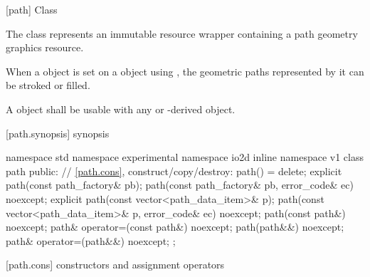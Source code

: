  [path] {Class }

\pnum
{}
The  class represents an immutable resource wrapper containing a path geometry graphics resource.

\pnum
When a  object is set on a  object using 
, the geometric paths represented by it can be 
stroked or filled.

\pnum
A  object shall be usable with any  or -derived object.

 [path.synopsis] { synopsis}

\begin{codeblock}
namespace std { namespace experimental { namespace io2d { inline namespace v1 {
  class path {
    public:
    // \ref{path.cons}, construct/copy/destroy:
    path() = delete;
    explicit path(const path_factory& pb);
    path(const path_factory& pb, error_code& ec) noexcept;
    explicit path(const vector<path_data_item>& p);
    path(const vector<path_data_item>& p, error_code& ec) noexcept;
    path(const path&) noexcept;
    path& operator=(const path&) noexcept;
    path(path&&) noexcept;
    path& operator=(path&&) noexcept;
  };
} } } }
\end{codeblock}

 [path.cons] { constructors and assignment operators}


